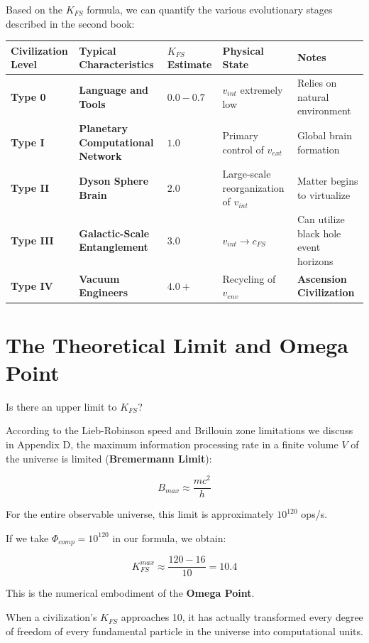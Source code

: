 Based on the $K_{FS}$ formula, we can quantify the various evolutionary stages described in the second book:

\begin{table}[h]
\centering
\begin{tabular}{|l|l|l|l|l|}
\hline
\textbf{Civilization Level} & \textbf{Typical Characteristics} & \textbf{$K_{FS}$ Estimate} & \textbf{Physical State} & \textbf{Notes} \\
\hline
\textbf{Type 0} & \textbf{Language and Tools} & $0.0 - 0.7$ & $v_{int}$ extremely low & Relies on natural environment \\
\hline
\textbf{Type I} & \textbf{Planetary Computational Network} & $1.0$ & Primary control of $v_{ext}$ & Global brain formation \\
\hline
\textbf{Type II} & \textbf{Dyson Sphere Brain} & $2.0$ & Large-scale reorganization of $v_{int}$ & Matter begins to virtualize \\
\hline
\textbf{Type III} & \textbf{Galactic-Scale Entanglement} & $3.0$ & $v_{int} \to c_{FS}$ & Can utilize black hole event horizons \\
\hline
\textbf{Type IV} & \textbf{Vacuum Engineers} & $4.0+$ & Recycling of $v_{env}$ & \textbf{Ascension Civilization} \\
\hline
\end{tabular}
\end{table}

\section{The Theoretical Limit and Omega Point}

Is there an upper limit to $K_{FS}$?

According to the Lieb-Robinson speed and Brillouin zone limitations we discuss in Appendix D, the maximum information processing rate in a finite volume $V$ of the universe is limited (\textbf{Bremermann Limit}):

\[B_{max} \approx \frac{mc^2}{h}\]

For the entire observable universe, this limit is approximately $10^{120}$ ops/s.

If we take $\Phi_{comp} = 10^{120}$ in our formula, we obtain:

\[K_{FS}^{max} \approx \frac{120 - 16}{10} = 10.4\]

This is the numerical embodiment of the \textbf{Omega Point}.

When a civilization's $K_{FS}$ approaches 10, it has actually transformed every degree of freedom of every fundamental particle in the universe into computational units.

